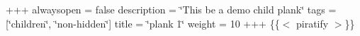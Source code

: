 +++ alwaysopen = false description = \char`\"{}\+This be a demo child plank\char`\"{} tags = \mbox{[}\char`\"{}children\char`\"{}, \char`\"{}non-\/hidden\char`\"{}\mbox{]} title = \char`\"{}plank 1\char`\"{} weight = 10 +++ \{\{$<$ piratify $>$\}\} 